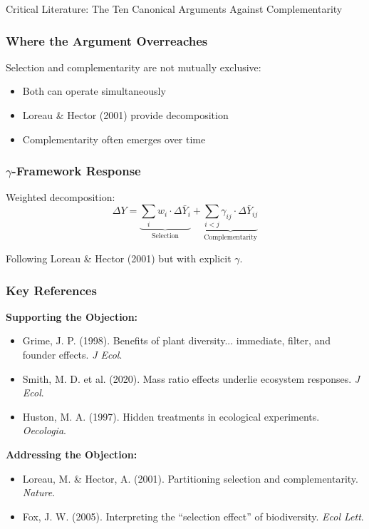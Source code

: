 \begin{chapter}{Critical Literature: The Ten Canonical Arguments Against Complementarity}
\subsubsection{Where the Argument Overreaches}

Selection and complementarity are not mutually exclusive:
\begin{itemize}[noitemsep]
    \item Both can operate simultaneously
    \item Loreau \& Hector (2001) provide decomposition
    \item Complementarity often emerges over time
\end{itemize}

\subsubsection{$\gamma$-Framework Response}

Weighted decomposition:
\[
\Delta Y = \underbrace{\sum_i w_i \cdot \Delta \bar{Y}_i}_{\text{Selection}} + \underbrace{\sum_{i<j} \gamma_{ij} \cdot \Delta \bar{Y}_{ij}}_{\text{Complementarity}}
\]

Following Loreau \& Hector (2001) but with explicit $\gamma$.

\subsubsection{Key References}

\textbf{Supporting the Objection:}
\begin{itemize}[noitemsep]
    \item Grime, J. P. (1998). Benefits of plant diversity... immediate, filter, and founder effects. \textit{J Ecol}.
    \item Smith, M. D. et al. (2020). Mass ratio effects underlie ecosystem responses. \textit{J Ecol}.
    \item Huston, M. A. (1997). Hidden treatments in ecological experiments. \textit{Oecologia}.
\end{itemize}

\textbf{Addressing the Objection:}
\begin{itemize}[noitemsep]
    \item Loreau, M. \& Hector, A. (2001). Partitioning selection and complementarity. \textit{Nature}.
    \item Fox, J. W. (2005). Interpreting the ``selection effect'' of biodiversity. \textit{Ecol Lett}.
\end{itemize}


\end{chapter}

